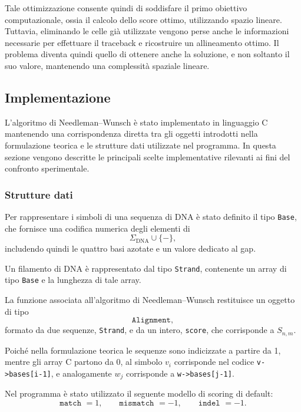 Tale ottimizzazione consente quindi di soddisfare il primo obiettivo computazionale, ossia il calcolo dello score ottimo, 
utilizzando spazio lineare. Tuttavia, eliminando le celle già utilizzate vengono perse anche le informazioni necessarie per effettuare
il traceback e ricostruire un allineamento ottimo. Il problema diventa quindi quello di ottenere anche la soluzione,
e non soltanto il suo valore, mantenendo una complessità spaziale lineare.


\subsection{Implementazione}

L'algoritmo di Needleman--Wunsch è stato implementato in linguaggio C mantenendo una corrispondenza diretta tra gli oggetti introdotti nella
formulazione teorica e le strutture dati utilizzate nel programma.
In questa sezione vengono descritte le principali scelte implementative rilevanti ai fini del confronto sperimentale.

\subsubsection{Strutture dati}

Per rappresentare i simboli di una sequenza di DNA è stato definito il tipo \texttt{Base},
che fornisce una codifica numerica degli elementi di
\[
    \Sigma_{\text{DNA}} \cup \{ - \},
\]
includendo quindi le quattro basi azotate e un valore dedicato al gap.

Un filamento di DNA è rappresentato dal tipo \texttt{Strand}, contenente un array di tipo \texttt{Base} e la lunghezza di tale array.

La funzione associata all'algoritmo di Needleman--Wunsch restituisce un oggetto di tipo
\[
    \texttt{Alignment},
\]
formato da due sequenze, \texttt{Strand}, e da un intero, \texttt{score}, che corrisponde a $S_{n,m}$.

Poiché nella formulazione teorica le sequenze sono indicizzate a partire da 1, mentre gli array C partono da 0, al simbolo $v_{i}$ corrisponde
nel codice \texttt{v->bases[i-1]}, e analogamente $w_{j}$ corrisponde a \texttt{w->bases[j-1]}.

Nel programma è stato utilizzato il seguente modello di scoring di default:
\[
    \texttt{match } = 1, \qquad \texttt{mismatch } = -1, \qquad \texttt{indel } = -1.
\]

